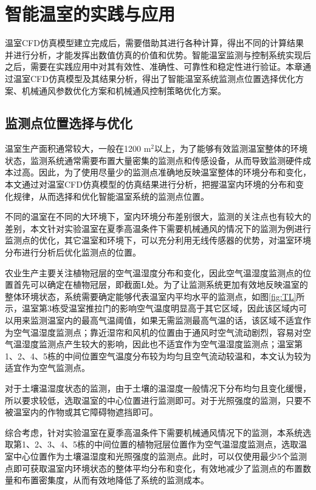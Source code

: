 

\chapter{智能温室的实践与应用}
\label{chapter:Application}
温室CFD仿真模型建立完成后，需要借助其进行各种计算，得出不同的计算结果并进行分析，才能发挥出数值仿真的价值和优势。智能温室监测与控制系统实现后之后，需要在实践应用中对其有效性、准确性、可靠性和稳定性进行验证。本章通过温室CFD仿真模型及其结果分析，得出了智能温室系统监测点位置选择优化方案、机械通风参数优化方案和机械通风控制策略优化方案。

\section{监测点位置选择与优化}
温室生产面积通常较大，一般在1200 $\text{m}^{2}$以上，为了能够有效监测温室整体的环境状态，监测系统通常需要布置大量密集的监测点和传感设备，从而导致监测硬件成本过高。因此，为了使用尽量少的监测点准确地反映温室整体的环境分布和变化，本文通过对温室CFD仿真模型的仿真结果进行分析，把握温室内环境的分布和变化规律，从而选择和优化智能温室系统的监测点位置。

不同的温室在不同的大环境下，室内环境分布差别很大，监测的关注点也有较大的差别，本文针对实验温室在夏季高温条件下需要机械通风的情况下的监测为例进行监测点的优化，其它温室和环境下，可以充分利用无线传感器的优势，对温室环境分布进行分析后优化监测点的位置。

农业生产主要关注植物冠层的空气温湿度分布和变化，因此空气温湿度监测点的位置首先可以确定在植物冠层，即截面L处。为了让监测系统更加有效地反映温室的整体环境状态，系统需要确定能够代表温室内平均水平的监测点，如图\ref{fig:TL}所示，温室第3栋受温室推拉门的影响空气温度明显高于其它区域，因此该区域内可以用来监测温室内的最高气温阈值，如果无需监测最高气温的话，该区域不适宜作为空气温湿度监测点；靠近湿帘和风机的位置由于通风时空气流动剧烈，容易对空气温湿度监测点产生较大的影响，因此也不适宜作为空气温湿度监测点；温室第1、2、4、5栋的中间位置空气温度分布较为均匀且空气流动较温和，本文认为较为适宜作为空气监测点。

对于土壤温湿度状态的监测，由于土壤的温湿度一般情况下分布均匀且变化缓慢，所以要求较低，选取温室的中心位置进行监测即可。对于光照强度的监测，只要不被温室内的作物或其它障碍物遮挡即可。

综合考虑，针对实验温室在夏季高温条件下需要机械通风情况下的监测，本系统选取第1、2、3、4、5栋的中间位置的植物冠层位置作为空气温湿度监测点，选取温室中心位置作为土壤温湿度和光照强度的监测点。此时，可以仅使用最少5个监测点即可获取温室内环境状态的整体平均分布和变化，有效地减少了监测点的布置数量和布置密集度，从而有效地降低了系统的监测成本。

